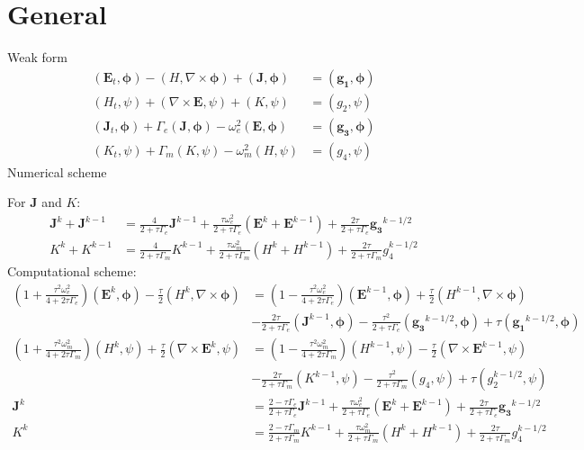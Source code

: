 \documentclass[12pt,reqno]{amsart}
\numberwithin{equation}{section}
\def\E{\ensuremath{\mathbf{E}}}
\def\J{\ensuremath{\mathbf{J}}}
\def\bphi{\ensuremath{\bm{\phi}}}
\def\go{\ensuremath{\mathbf{g_1}}}
\def\gt{\ensuremath{\mathbf{g_3}}}
\begin{document}
\section{General}
Weak form
\begin{align}
(\E_t,\bphi)-(H,\nabla\times\bphi)+(\J,\bphi)	&=(\go,\bphi)\\
(H_t,\psi)+(\nabla\times \E,\psi)+(K,\psi)	&=(g_2,\psi)\\
(\J_t,\bphi)+\Gamma_e(\J,\bphi)-\omega_e^2(\E,\bphi)	&=(\gt,\bphi)\\
(K_t,\psi)+\Gamma_m(K,\psi)-\omega_m^2(H,\psi)	&=(g_4,\psi)
\end{align}
Numerical scheme

For $ \J $ and $ K $:
\begin{align*}
\J^k+\J^{k-1}	&=\frac{4}{2+\tau \Gamma_e}\J^{k-1}+\frac{\tau\omega_e^2}{2+\tau\Gamma_e}(\E^k+\E^{k-1})+\frac{2\tau}{2+\tau\Gamma_e}\gt^{k-1/2}\\
K^k+K^{k-1}	&=\frac{4}{2+\tau\Gamma_m}K^{k-1}+\frac{\tau\omega_m^2}{2+\tau\Gamma_m}(H^k+H^{k-1})+\frac{2\tau}{2+\tau\Gamma_m}g_4^{k-1/2}
\end{align*}
Computational scheme:
\begin{align}
\left(1+\frac{\tau^2\omega_e^2}{4+2\tau\Gamma_e}\right)(\E^k,\bphi)-\frac{\tau}{2}(H^k,\nabla\times\bphi)	&=\left(1-\frac{\tau^2\omega_e^2}{4+2\tau\Gamma_e}\right)(\E^{k-1},\bphi)+\frac{\tau}{2}(H^{k-1},\nabla\times\bphi)\nonumber\\
&-\frac{2\tau}{2+\tau\Gamma_e}(\J^{k-1},\bphi)-\frac{\tau^2}{2+\tau\Gamma_e}(\gt^{k-1/2},\bphi)+\tau(\go^{k-1/2},\bphi)\\
\left(1+\frac{\tau^2\omega_m^2}{4+2\tau\Gamma_m}\right)(H^k,\psi)+\frac{\tau}{2}(\nabla\times\E^k,\psi)	&=\left(1-\frac{\tau^2\omega_m^2}{4+2\tau\Gamma_m}\right)(H^{k-1},\psi)-\frac{\tau}{2}(\nabla\times\E^{k-1},\psi)\nonumber\\
&-\frac{2\tau}{2+\tau\Gamma_m}(K^{k-1},\psi)-\frac{\tau^2}{2+\tau\Gamma_m}(g_4,\psi)+\tau(g_2^{k-1/2},\psi)\\
\J^k	&=\frac{2-\tau\Gamma_e}{2+\tau\Gamma_e}\J^{k-1}+\frac{\tau\omega_e^2}{2+\tau\Gamma_e}(\E^k+\E^{k-1})+\frac{2\tau}{2+\tau\Gamma_e}\gt^{k-1/2}\\
K^k	&=\frac{2-\tau\Gamma_m}{2+\tau\Gamma_m}K^{k-1}+\frac{\tau\omega_m^2}{2+\tau\Gamma_m}(H^k+H^{k-1})+\frac{2\tau}{2+\tau\Gamma_m}g_4^{k-1/2}
\end{align}
\end{document}
